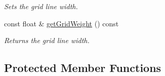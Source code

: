 \begin{DoxyCompactItemize}
\begin{DoxyCompactList}\small\item\em Sets the grid line width. \end{DoxyCompactList}\item 
\hypertarget{class_ui_plot_ad8d367aaafa3fbf36506c280b8e40122}{const float \& \hyperlink{class_ui_plot_ad8d367aaafa3fbf36506c280b8e40122}{get\-Grid\-Weight} () const }\label{class_ui_plot_ad8d367aaafa3fbf36506c280b8e40122}

\begin{DoxyCompactList}\small\item\em Returns the grid line width. \end{DoxyCompactList}\end{DoxyCompactItemize}
\subsection*{Protected Member Functions}
